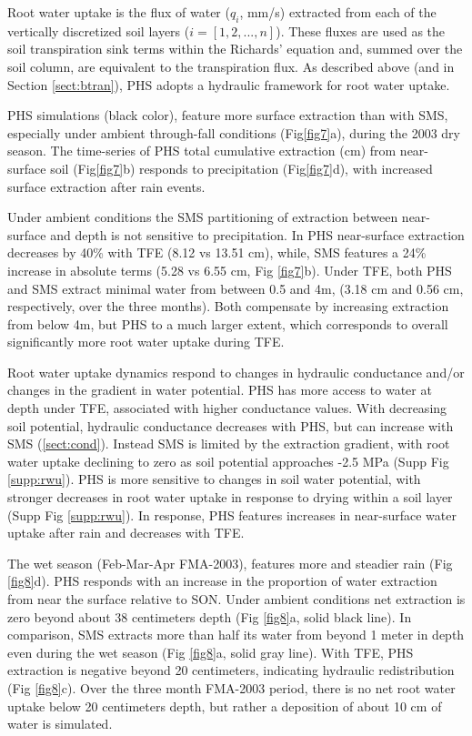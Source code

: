 \documentclass[draft,linenumbers]{agujournal}
\begin{document}
    Root water uptake is the flux of water ($q_i$, mm/s) extracted from each of the vertically discretized soil layers ($i=\left[1,2,...,n\right]$). These fluxes are used as the soil transpiration sink terms within the Richards' equation \citep{oleson2013} and, summed over the soil column, are equivalent to the transpiration flux. As described above (and in Section \ref{sect:btran}), PHS adopts a hydraulic framework for root water uptake. 

    PHS simulations (black color), feature more surface extraction than with SMS, especially under ambient through-fall conditions (Fig\ref{fig7}a), during the 2003 dry season. The time-series of PHS total cumulative extraction (cm) from near-surface soil (Fig\ref{fig7}b) responds to precipitation (Fig\ref{fig7}d), with increased surface extraction after rain events.
    
    Under ambient conditions the SMS partitioning of extraction between near-surface and depth is not sensitive to precipitation. In PHS near-surface extraction decreases by 40\% with TFE (8.12 vs 13.51 cm), while, SMS features a 24\% increase in absolute terms (5.28 vs 6.55 cm, Fig \ref{fig7}b). Under TFE, both PHS and SMS extract minimal water from between 0.5 and 4m, (3.18 cm and 0.56 cm, respectively, over the three months). Both compensate by increasing extraction from below 4m, but PHS to a much larger extent, which corresponds to overall significantly more root water uptake during TFE.
    
    Root water uptake dynamics respond to changes in hydraulic conductance and/or changes in the gradient in water potential. PHS has more access to water at depth under TFE, associated with higher conductance values. With decreasing soil potential, hydraulic conductance decreases with PHS, but can increase with SMS (\ref{sect:cond}). Instead SMS is limited by the extraction gradient, with root water uptake declining to zero as soil potential approaches -2.5 MPa (Supp Fig \ref{supp:rwu}). PHS is more sensitive to changes in soil water potential, with stronger decreases in root water uptake in response to drying within a soil layer (Supp Fig \ref{supp:rwu}). In response, PHS features increases in near-surface water uptake after rain and decreases with TFE.

    The wet season (Feb-Mar-Apr FMA-2003), features more and steadier rain (Fig \ref{fig8}d). PHS responds with an increase in the proportion of water extraction from near the surface relative to SON. Under ambient conditions net extraction is zero beyond about 38 centimeters depth (Fig \ref{fig8}a, solid black line). In comparison, SMS extracts more than half its water from beyond 1 meter in depth even during the wet season (Fig \ref{fig8}a, solid gray line). With TFE, PHS extraction is negative beyond 20 centimeters, indicating hydraulic redistribution (Fig \ref{fig8}c). Over the three month FMA-2003 period, there is no net root water uptake below 20 centimeters depth, but rather a deposition of about 10 cm of water is simulated.
    
\end{document}
